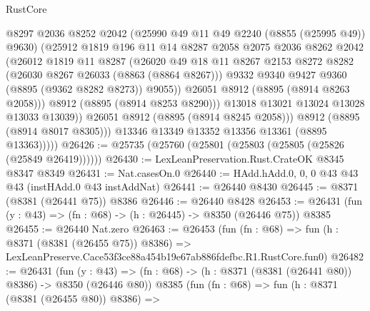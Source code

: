 \begin{lexlean}{RustCore}
\begin{coremodule}
                      @8297
                      @2036
                      @8252
                      @2042
                      (@25990 @49 @11 @49 @2240 (@8855 (@25995 @49)) @9630)
                      (@25912
                        @1819
                        @196
                        @11
                        @14
                        @8287
                        @2058
                        @2075
                        @2036
                        @8262
                        @2042
                        (@26012
                          @1819
                          @11
                          @8287
                          (@26020
                            @49
                            @18
                            @11
                            @8267
                            @2153
                            @8272
                            @8282
                            (@26030 @8267 @26033 (@8863 (@8864 @8267)))
                            @9332
                            @9340
                            @9427
                            @9360
                            (@8895 (@9362 @8282 @8273))
                            @9055))
                        @26051
                        @8912
                        (@8895 (@8914 @8263 @2058)))
                      @8912
                      (@8895 (@8914 @8253 @8290)))
                    @13018
                    @13021
                    @13024
                    @13028
                    @13033
                    @13039))
                @26051
                @8912
                (@8895 (@8914 @8245 @2058)))
              @8912
              (@8895 (@8914 @8017 @8305)))
            @13346
            @13349
            @13352
            @13356
            @13361
            (@8895 @13363)))))
@26426 := @25735 (@25760 (@25801 (@25803 (@25805 (@25826 (@25849 @26419))))))
@26430 := LexLeanPreservation.Rust.CrateOK @8345 @8347 @8349
@26431 := Nat.casesOn.{0}
@26440 := HAdd.hAdd.{0, 0, 0} @43 @43 @43 (instHAdd.{0} @43 instAddNat)
@26441 := @26440 @8430
@26445 := @8371 (@8381 (@26441 @75)) @8386
@26446 := @26440 @8428
@26453 := @26431 (fun (y : @43) => (fn : @68) -> (h : @26445) -> @8350 (@26446 @75)) @8385
@26455 := @26440 Nat.zero
@26463 := @26453
    (fun (fn : @68) =>
    fun (h : @8371 (@8381 (@26455 @75)) @8386) =>
    LexLeanPreserve.Cace53f3ce88a454b19e67ab886fdefbc.R1.RustCore.fun0)
@26482 := @26431
    (fun (y : @43) => (fn : @68) -> (h : @8371 (@8381 (@26441 @80)) @8386) -> @8350 (@26446 @80))
    @8385
    (fun (fn : @68) =>
    fun (h : @8371 (@8381 (@26455 @80)) @8386) =>

\end{coremodule}
\end{lexlean}
